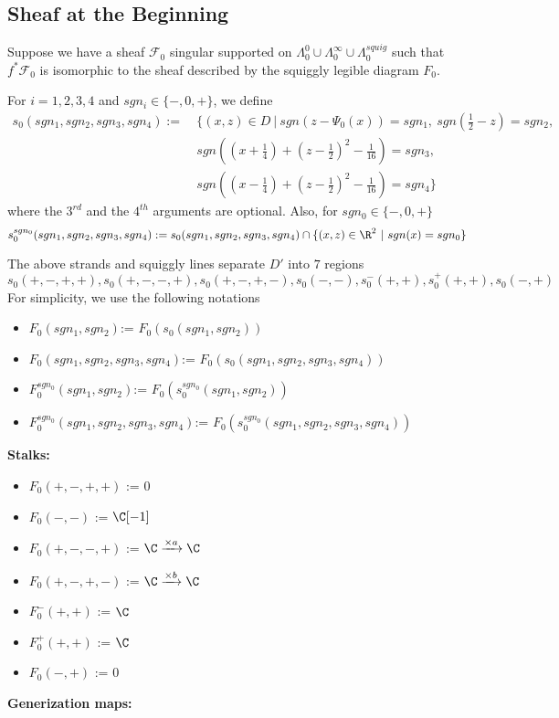 \subsection{Sheaf at the Beginning}
Suppose we have a sheaf $\mathscr{F}_0$ singular supported on $\Lambda_0^0 \cup \Lambda_0^\infty \cup \Lambda_0^{squig}$ such that $f^*\mathscr{F}_0$ is isomorphic to the sheaf described by the squiggly legible diagram $F_0$.

\begin{definition}
For $i = 1,2,3,4$ and $sgn_i \in \{-,0,+\}$, we define
\begin{align*}
s_0(sgn_1,sgn_2,sgn_3,sgn_4):=~ &\{(x,z) \in D ~|~ sgn(z-\Psi_0(x))=sgn_1,~ sgn(\frac{1}{2}-z)=sgn_2,\\ 
&sgn((x+\frac{1}{4})+(z-\frac{1}{2})^2 - \frac{1}{16})=sgn_3,\\
&sgn((x-\frac{1}{4})+(z-\frac{1}{2})^2 - \frac{1}{16})=sgn_4 \}
\end{align*}
where the $3^{rd}$ and the $4^{th}$ arguments are optional. Also, for $sgn_0 \in \{-,0,+\}$ \[
s_0^{sgn_0}(sgn_1,sgn_2,sgn_3,sgn_4) := s_0(sgn_1,sgn_2,sgn_3,sgn_4) \cap \{(x,z)\in \R^2 ~|~ sgn(x)=sgn_0 \} 
\]
\end{definition}

The above strands and squiggly lines separate $D'$ into $7$ regions
\[
	s_0(+,-,+,+),s_0(+,-,-,+),s_0(+,-,+,-),s_0(-,-),s_0^-(+,+),s_0^+(+,+),s_0(-,+)
\]
For simplicity, we use the following notations
\begin{itemize}
\item $F_0(sgn_1,sgn_2)$:= $F_0(s_0(sgn_1,sgn_2))$
\item $F_0(sgn_1,sgn_2,sgn_3,sgn_4)$:= $F_0(s_0(sgn_1,sgn_2,sgn_3,sgn_4))$
\item $F_0^{sgn_0}(sgn_1,sgn_2)$:= $F_0(s_0^{sgn_0}(sgn_1,sgn_2))$
\item $F_0^{sgn_0}(sgn_1,sgn_2,sgn_3,sgn_4)$:= $F_0(s_0^{sgn_0}(sgn_1,sgn_2,sgn_3,sgn_4))$
\end{itemize}
\textbf{Stalks:}

\begin{itemize}
\item $F_0(+,-,+,+)$ := $0$
\item $F_0(-,-)$ := $\C[-1]$
\item $F_0(+,-,-,+)$ := $\C \xrightarrow{\times a} \C $
\item $F_0(+,-,+,-)$ := $\C \xrightarrow{\times b} \C $
\item $F_0^-(+,+)$ := $\C$
\item $F_0^+(+,+)$ := $\C$
\item $F_0(-,+)$ := $0$
\end{itemize}
\textbf{Generization maps:}

